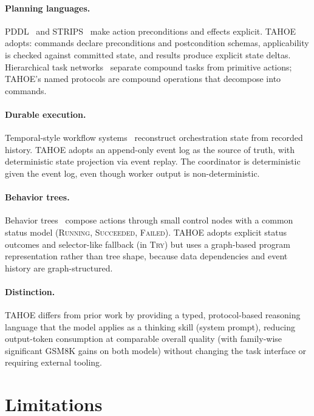 \documentclass[11pt,a4paper]{article}
\begin{document}
\paragraph{Planning languages.}
PDDL~\cite{fox2003pddl} and STRIPS~\cite{fikes1971strips} make action preconditions and effects explicit.
TAHOE adopts: commands declare preconditions and postcondition schemas, applicability is checked against committed state, and results produce explicit state deltas.
Hierarchical task networks~\cite{erol1994htn,nau2003shop2} separate compound tasks from primitive actions; TAHOE's named protocols are compound operations that decompose into commands.

\paragraph{Durable execution.}
Temporal-style workflow systems~\cite{temporal2024} reconstruct orchestration state from recorded history.
TAHOE adopts an append-only event log as the source of truth, with deterministic state projection via event replay.
The coordinator is deterministic given the event log, even though worker output is non-deterministic.

\paragraph{Behavior trees.}
Behavior trees~\cite{colledanchise2018bt} compose actions through small control nodes with a common status model (\textsc{Running}, \textsc{Succeeded}, \textsc{Failed}).
TAHOE adopts explicit status outcomes and selector-like fallback (in \textsc{Try}) but uses a graph-based program representation rather than tree shape, because data dependencies and event history are graph-structured.

\paragraph{Distinction.}
TAHOE differs from prior work by providing a typed, protocol-based reasoning language that the model applies as a thinking skill (system prompt), reducing output-token consumption at comparable overall quality (with family-wise significant GSM8K gains on both models) without changing the task interface or requiring external tooling.

\section{Limitations}
\label{sec:limitations}
\end{document}
